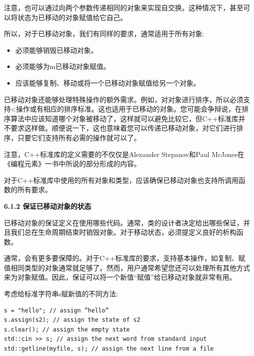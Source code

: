 注意，也可以通过向两个参数传递相同的对象来实现自交换。这种情况下，甚至可以将状态为已移动的对象赋值给它自己。\par

所以，对于已移动对象，我们有同样的要求，通常适用于所有对象:\par

\begin{itemize}
	\item 必须能够销毁已移动对象。
	\item 必须能够为m已移动对象赋值。
	\item 应该能够复制、移动或将一个已移动对象赋值给另一个对象。
\end{itemize}

已移动对象还能够处理特殊操作的额外需求。例如，对对象进行排序，所以必须支持<操作或有相应的排序标准。这也适用于已移动的对象。您可能会争辩说，在排序算法中应该知道哪个对象被移动了，这样就可以避免比较它，但C++标准库并不要求这样做。顺便说一下，这也意味着您可以传递已移动对象，对它们进行排序，只要它们支持所有必需的操作就可以了。\par

注意，C++标准库的定义需要的不仅仅是Alexander Stepanov和Paul McJones在《编程元素》一书中所说的部分形成的内容。\par

对于C++标准库中使用的所有对象和类型，应该确保已移动对象也支持所调用函数的所有要求。\par

\hspace*{\fill} \par %
\textbf{6.1.2 保证已移动对象的状态}

已移动对象的保证定义在使用哪些代码。通常，类的设计者决定给出哪些保证，并且我们总在生命周期结束时销毁对象。对于移动状态，必须提定义良好的析构函数。\par

通常，会有更多要保障的。对于C++标准库的要求，支持基本操作，如复制、赋值相同类型的对象通常就足够了。然而，用户通常希望您还可以处理所有其他方式来为对象赋值。因此，保证可以将一个新值“赋值”给已移动对象就非常有用。\par

考虑给标准字符串s赋新值的不同方法:\par

\begin{lstlisting}[caption={}]
s = "hello"; // assign ”hello”
s.assign(s2); // assign the state of s2
s.clear(); // assign the empty state
std::cin >> s; // assign the next word from standard input
std::getline(myfile, s); // assign the next line from a file
\end{lstlisting}

